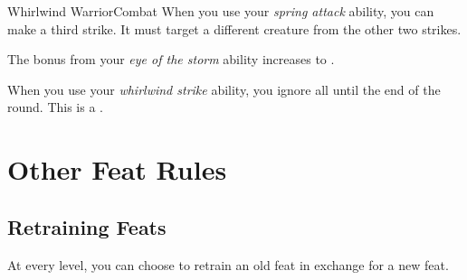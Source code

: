 \begin{feat}{Whirlwind Warrior}{Combat}
         When you use your \textit{spring attack} ability, you can make a third strike.
        It must target a different creature from the other two strikes.

         The bonus from your \textit{eye of the storm} ability increases to .

         When you use your \textit{whirlwind strike} ability, you ignore all  until the end of the round.
        This is a .
    \end{feat}

\section{Other Feat Rules}

    \subsection{Retraining Feats}
        At every level, you can choose to retrain an old feat in exchange for a new feat.
